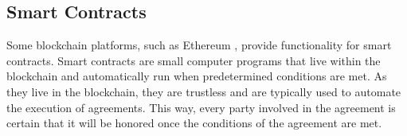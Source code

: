\subsection{Smart Contracts}

Some blockchain platforms, such as Ethereum \cite{wood2014ethereum}, provide functionality for smart contracts. Smart contracts are small computer programs that live within the blockchain and automatically run when predetermined conditions are met. As they live in the blockchain, they are trustless and are typically used to automate the execution of agreements. This way, every party involved in the agreement is certain that it will be honored once the conditions of the agreement are met.
